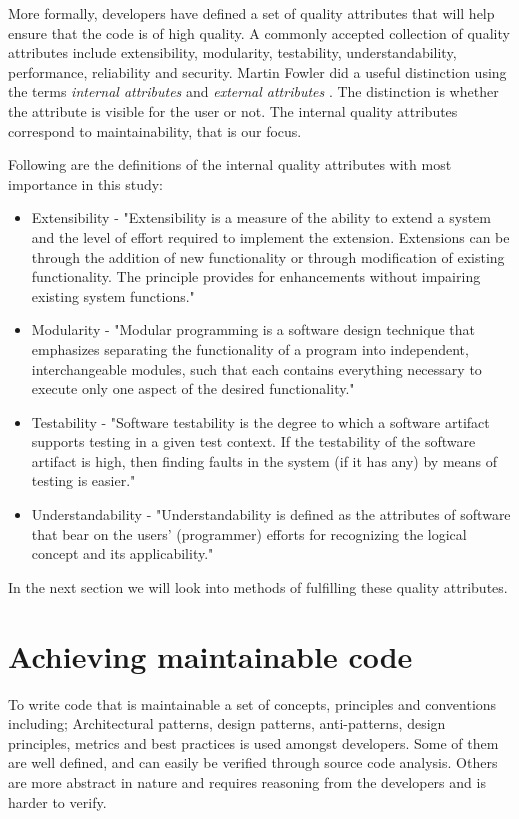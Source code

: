 \documentclass{report}
\begin{document}
More formally, developers have defined a set of quality attributes that will help ensure that the code is of high quality. A commonly accepted collection of quality attributes include extensibility, modularity, testability, understandability, performance, reliability and security. Martin Fowler did a useful distinction using the terms \textit{internal attributes} and \textit{external attributes} \cite{internalExternal}. The distinction is whether the attribute is visible for the user or not. The internal quality attributes correspond to maintainability, that is our focus. 

Following are the definitions of the internal quality attributes with most importance in this study:
\begin{itemize}
	\item Extensibility - "Extensibility is a measure of the ability to extend a system and the level of effort required to implement the extension. Extensions can be through the addition of new functionality or through modification of existing functionality. The principle provides for enhancements without impairing existing system functions." \cite{Extensib83:online}
    	\item Modularity - "Modular programming is a software design technique that emphasizes separating the functionality of a program into independent, interchangeable modules, such that each contains everything necessary to execute only one aspect of the desired functionality." \cite{Modularp60:online}
	\item Testability - "Software testability is the degree to which a software artifact supports testing in a given test context. If the testability of the software artifact is high, then finding faults in the system (if it has any) by means of testing is easier." \cite{Software40:online}
	\item Understandability - "Understandability is defined as the attributes of software that bear on the users' (programmer) efforts for recognizing the logical concept and its applicability." \cite{Understa26:online}
\end{itemize}

In the next section we will look into methods of fulfilling these quality attributes.

\section{Achieving maintainable code}
\label{achieving-maintainable-code}
To write code that is maintainable a set of concepts, principles and conventions including; Architectural patterns, design patterns, anti-patterns, design principles, metrics and best practices is used amongst developers. Some of them are well defined, and can easily be verified through source code analysis. Others are more abstract in nature and requires reasoning from the developers and is harder to verify.
\end{document}
